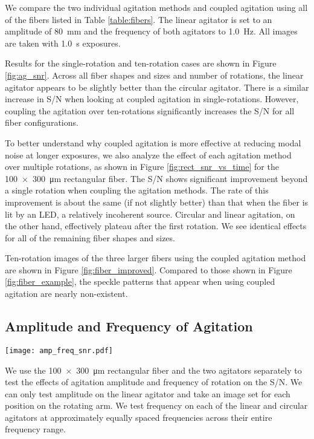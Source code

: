 \documentclass[twocolumn]{emulateapj}
\begin{document}
We compare the two individual agitation methods and coupled agitation using all of the fibers listed in Table \ref{table:fibers}. The linear agitator is set to an amplitude of \SI{80}{\milli\meter} and the frequency of both agitators to \SI{1.0}{\hertz}. All images are taken with \SI{1.0}{\second} exposures.

Results for the single-rotation and ten-rotation cases are shown in Figure \ref{fig:ag_snr}. Across all fiber shapes and sizes and number of rotations, the linear agitator appears to be slightly better than the circular agitator. There is a similar increase in S/N when looking at coupled agitation in single-rotations. However, coupling the agitation over ten-rotations significantly increases the S/N for all fiber configurations.

To better understand why coupled agitation is more effective at reducing modal noise at longer exposures, we also analyze the effect of each agitation method over multiple rotations, as shown in Figure \ref{fig:rect_snr_vs_time} for the \SI{100x300}{\micro\meter} rectangular fiber. The S/N shows significant improvement beyond a single rotation when coupling the agitation methods. The rate of this improvement is about the same (if not slightly better) than that when the fiber is lit by an LED, a relatively incoherent source. Circular and linear agitation, on the other hand, effectively plateau after the first rotation. We see identical effects for all of the remaining fiber shapes and sizes.

Ten-rotation images of the three larger fibers using the coupled agitation method are shown in Figure \ref{fig:fiber_improved}. Compared to those shown in Figure \ref{fig:fiber_example}, the speckle patterns that appear when using coupled agitation are nearly non-existent.

\subsection{Amplitude and Frequency of Agitation}
\label{subsec:amp_freq}

\begin{figure*}[t]
\centering
	\texttt{[image: amp\_freq\_snr.pdf]}
	\caption{S/N comparison for varying amplitudes using the linear agitator (left) and varying frequencies using each of the linear (center) and circular (right) agitators.}
\label{fig:amp_freq_snr}
\end{figure*}

We use the \SI{100x300}{\micro\meter} rectangular fiber and the two agitators separately to test the effects of agitation amplitude and frequency of rotation on the S/N. We can only test amplitude on the linear agitator and take an image set for each position on the rotating arm. We test frequency on each of the linear and circular agitators at approximately equally spaced frequencies across their entire frequency range.
\end{document}
